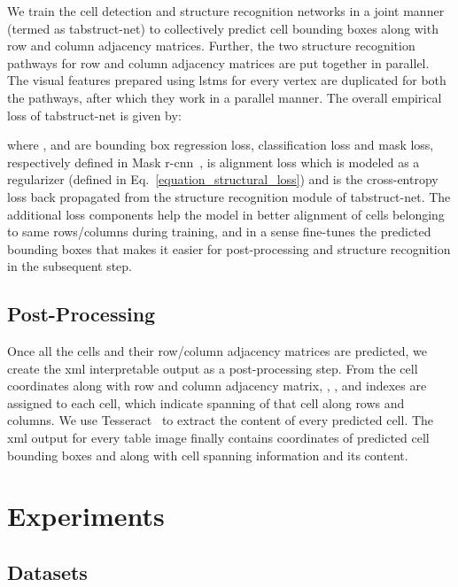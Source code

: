\documentclass[runningheads]{llncs}
\begin{document}
We train the cell detection and structure recognition networks in a joint manner (termed as {\sc t}ab{\sc s}truct-{\sc n}et) to collectively predict cell bounding boxes along with row and column adjacency matrices. Further, the two structure recognition pathways for row and column adjacency matrices are put together in parallel. The visual features prepared using {\sc lstm}s for every vertex are duplicated for both the pathways, after which they work in a parallel manner. The overall empirical loss of {\sc t}ab{\sc s}truct-{\sc n}et is given by:

where ,  and  are bounding box regression loss, classification loss and mask loss, respectively defined in Mask {\sc r-cnn}~\cite{he2017mask},  is alignment loss which is modeled as a regularizer (defined in Eq.~\ref{equation_structural_loss}) and  is the cross-entropy loss back propagated from the structure recognition module of {\sc t}ab{\sc s}truct-{\sc n}et. The additional loss components help the model in better alignment of cells belonging to same rows/columns during training, and in a sense fine-tunes the predicted bounding boxes that makes it easier for post-processing and structure recognition in the subsequent step. 

\subsection{Post-Processing}

Once all the cells and their row/column adjacency matrices are predicted, we create the {\sc xml} interpretable output as a post-processing step. From the cell coordinates along with row and column adjacency matrix, , ,  and  indexes are assigned to each cell, which indicate spanning of that cell along rows and columns. We use Tesseract~\cite{smith2007overview} to extract the content of every predicted cell. The {\sc xml} output for every table image finally contains coordinates of predicted cell bounding boxes and along with cell spanning information and its content. 

\section{Experiments} \label{experiments}

\subsection{Datasets} \label{dataset}
\end{document}
